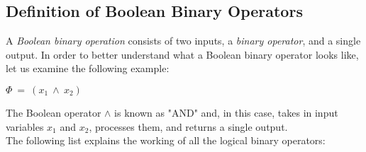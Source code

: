\documentclass[]{usiinfbachelorproject}
\begin{document}
\subsection{Definition of Boolean Binary Operators}\label{subsubsec:definition-of-boolean-binary-operators}
A \textit{Boolean binary operation} consists of two inputs, a \textit{binary operator}, and a single output. In order to better understand what a Boolean binary operator looks like, let us examine the following example:
\begin{center}
    $\Phi \ = \ (x_1 \ \land \ x_2)$
\end{center}
The Boolean operator $\land$ is known as "AND" and, in this case, takes in input variables $x_1$ and $x_2$, processes them, and returns a single output. \\
The following list explains the working of all the logical binary operators:
\end{document}
